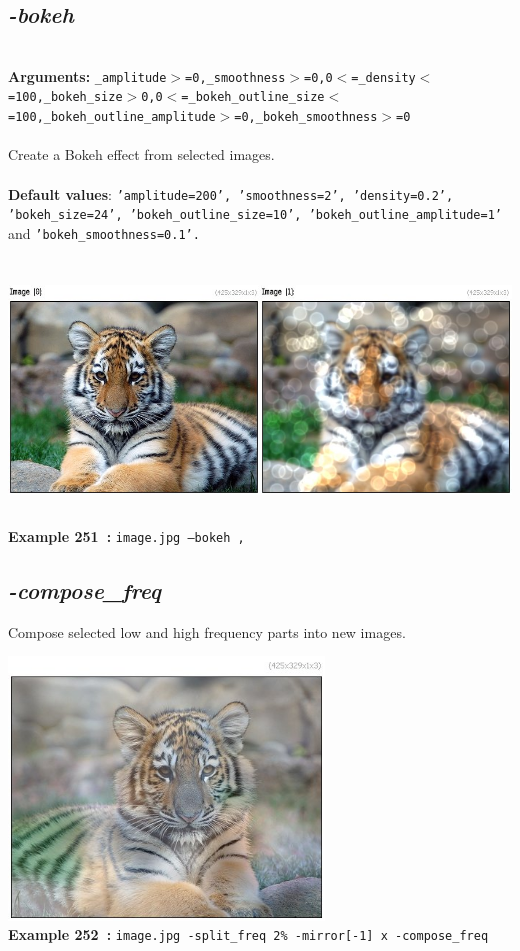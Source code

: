 \documentclass[a4paper,11pt,twoside]{book}
\begin{document}
\subsection{\emph{-bokeh} }\vspace*{-0.5em}
~\\\textbf{Arguments: } 
{\small \texttt{\_amplitude$>$=0,\_smoothness$>$=0,0$<$=\_density$<$=100,\_bokeh\_size$>$0,0$<$=\_bokeh\_outline\_size$<$=100,\_bokeh\_outline\_amplitude$>$=0,\_bokeh\_smoothness$>$=0}}\\~\\
Create a Bokeh effect from selected images.
~\\~\\\textbf{Default values}: {\small \texttt{'amplitude=200', 'smoothness=2', 'density=0.2', 'bokeh\_size=24', 'bokeh\_outline\_size=10', 'bokeh\_outline\_amplitude=1'} and \texttt{'bokeh\_smoothness=0.1'.}}
\begin{center}\includegraphics[keepaspectratio=true,height=7cm,width=\textwidth]{img/gmic_def251.jpg}\\
{\footnotesize \textbf{Example 251~:} \texttt{image.jpg --bokeh ,}}
\end{center}

\subsection{\emph{-compose\_freq} }\vspace*{-0.5em}
Compose selected low and high frequency parts into new images.
\begin{center}\includegraphics[keepaspectratio=true,height=7cm,width=\textwidth]{img/gmic_def252.jpg}\\
{\footnotesize \textbf{Example 252~:} \texttt{image.jpg -split\_freq 2\% -mirror[-1] x -compose\_freq}}
\end{center}
\end{document}
